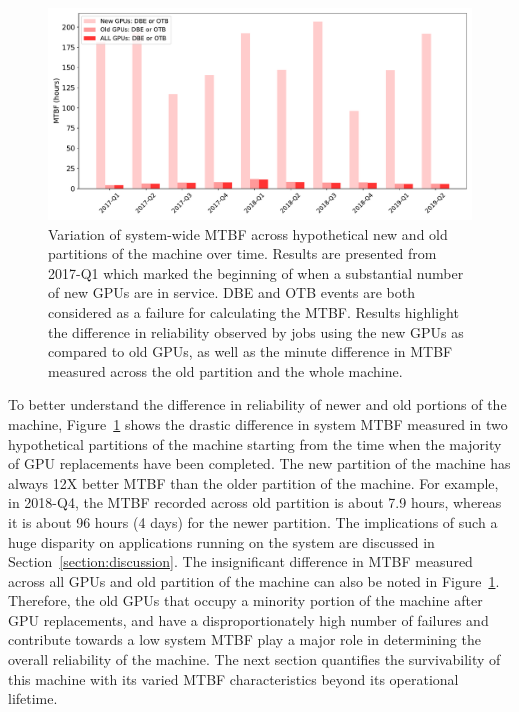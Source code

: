 \begin{figure}[bt]
  \begin{center}
    \includegraphics[width=\columnwidth]{figs/MTBF_quaterly_sys_NewOldALL.pdf}
  \end{center}
  \caption{Variation of system-wide MTBF across hypothetical new and old partitions of the machine over time.
Results are presented from 2017-Q1 which marked the beginning of when a substantial number of new GPUs are in service.
DBE and OTB events are both considered as a failure for calculating the MTBF.
Results highlight the difference in reliability observed by jobs using the new GPUs as compared to old GPUs,
as well as the minute difference in MTBF measured across the old partition and the whole machine.}
  \label{fig:MTBF_sys_NewOld}
\end{figure}

To better understand the difference in reliability of newer and old portions of the machine, 
Figure~\ref{fig:MTBF_sys_NewOld} shows the drastic difference in system MTBF measured in two hypothetical
partitions of the machine starting from the time when the majority of GPU replacements have been completed. 
The new partition of the machine has always 12X better MTBF than the older partition
of the machine. For example, in 2018-Q4, the MTBF recorded across old partition is about 7.9 hours, whereas it is about
96 hours (4 days) for the newer partition. The implications of such a huge disparity on applications running on the 
system are discussed in Section~\ref{section:discussion}. The insignificant difference in MTBF measured across all GPUs and
old partition of the machine can also be noted in Figure~\ref{fig:MTBF_sys_NewOld}.  
Therefore, the old GPUs that occupy a minority portion of the machine after GPU replacements, 
and have a disproportionately high number of failures and contribute towards a low system MTBF play a major role 
in determining the overall reliability of the machine.
The next section quantifies the survivability of this machine with its varied MTBF characteristics beyond its operational lifetime.

